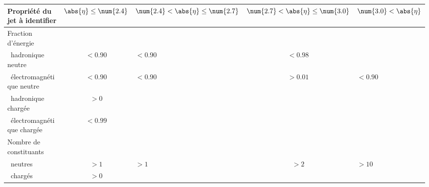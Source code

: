 \begin{tabularx}{\textwidth}{lcYcY}
\toprule
Propriété du jet à identifier & $\abs{\eta}\leq\num{2.4}$ & $\num{2.4}<\abs{\eta}\leq\num{2.7}$ & $\num{2.7}<\abs{\eta}\leq\num{3.0}$ & $\num{3.0}<\abs{\eta}$ \\
\midrule
Fraction d'énergie\\
\ hadronique neutre & $<\num{0.90}$ & $<\num{0.90}$ & $<\num{0.98}$ & \\
\ électromagnétique neutre & $<\num{0.90}$ & $<\num{0.90}$ & $>\num{0.01}$ & $<\num{0.90}$ \\
\ hadronique chargée & $>\num{0}$ &&&\\
\ électromagnétique chargée & $<\num{0.99}$ &&&\\
\midrule
Nombre de constituants\\
\ neutres & $>\num{1}$ & $>\num{1}$ & $>\num{2}$ & $>\num{10}$ \\
\ chargés & $>\num{0}$ &&&\\
\bottomrule
\end{tabularx}
